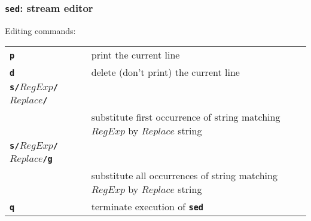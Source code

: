 \begin{frame}[shrink]
\frametitle{\textbf{\tt{sed}}: stream editor}
Editing commands:

\begin{center}
\begin{tabular}{lll}

  \begin{minipage}{2cm}{\bf{\textbf{\tt{p}}}} ~\end{minipage}
   & \begin{minipage}{8cm}print the current line~\end{minipage}
\\[1ex]

  \begin{minipage}{2cm}{\bf{\textbf{\tt{d}}}} ~\end{minipage}
   & \begin{minipage}{8cm}delete (don't print) the current line~\end{minipage}
\\[1ex]

  \begin{minipage}{2cm}{\bf{\textbf{\tt{s/}}$RegExp$\textbf{\tt{/}}$Replace$\textbf{\tt{/}}}} ~\end{minipage} \\
   & \begin{minipage}{8cm}substitute first occurrence of string matching $RegExp$ by $Replace$ string~\end{minipage}
\\[1ex]

  \begin{minipage}{2cm}{\bf{\textbf{\tt{s/}}$RegExp$\textbf{\tt{/}}$Replace$\textbf{\tt{/g}}}} ~\end{minipage} \\
   & \begin{minipage}{8cm}substitute all occurrences of string matching $RegExp$ by $Replace$ string~\end{minipage}
\\[1ex]

  \begin{minipage}{2cm}{\bf{\textbf{\tt{q}}}} ~\end{minipage}
   & \begin{minipage}{8cm}terminate execution of \textbf{\tt{sed}}~\end{minipage}
\end{tabular}
\end{center}

\end{frame}

